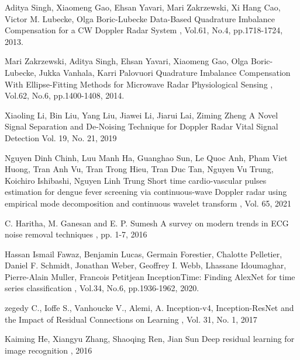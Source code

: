 \begin{bib}[100]
  Aditya Singh, Xiaomeng Gao, Ehsan Yavari, Mari Zakrzewski, Xi Hang Cao, Victor M. Lubecke, Olga Boric-Lubecke
  \newblock Data-Based Quadrature Imbalance Compensation for a CW Doppler Radar System
  , Vol.61, No.4, pp.1718-1724, 2013.

  Mari Zakrzewski, Aditya Singh, Ehsan Yavari, Xiaomeng Gao, Olga Boric-Lubecke, Jukka Vanhala, Karri Palovuori
  \newblock Quadrature Imbalance Compensation With Ellipse-Fitting Methods for Microwave Radar Physiological Sensing
  , Vol.62, No.6, pp.1400-1408, 2014.

Xiaoling Li, Bin Liu, Yang Liu, Jiawei Li, Jiarui Lai, Ziming Zheng
\newblock A Novel Signal Separation and De-Noising Technique for Doppler Radar Vital Signal Detection
 Vol. 19, No. 21, 2019

Nguyen Dinh Chinh, Luu Manh Ha, Guanghao Sun, Le Quoc Anh, Pham Viet Huong, Tran Anh Vu, Tran Trong Hieu, Tran Duc Tan, Nguyen Vu Trung, Koichiro Ishibashi, Nguyen Linh Trung
\newblock Short time cardio-vascular pulses estimation for dengue fever screening via continuous-wave Doppler radar using empirical mode decomposition and continuous wavelet transform
, Vol. 65, 2021

C. Haritha, M. Ganesan and E. P. Sumesh
\newblock A survey on modern trends in ECG noise removal techniques
, pp. 1-7, 2016 

  Hassan Ismail Fawaz, Benjamin Lucas, Germain Forestier, Chalotte Pelletier, Daniel F. Schmidt, Jonathan Weber, Geoffrey I. Webb, Lhassane Idoumaghar, Pierre-Alain Muller, Francois Petitjean
  \newblock InceptionTime: Finding AlexNet for time series classification
  , Vol.34, No.6, pp.1936-1962, 2020.

zegedy C., Ioffe S., Vanhoucke V., Alemi, A.
\newblock Inception-v4, Inception-ResNet and the Impact of Residual Connections on Learning
, Vol. 31, No. 1, 2017

Kaiming He, Xiangyu Zhang, Shaoqing Ren, Jian Sun
\newblock Deep residual learning for image recognition
, 2016


\end{bib}
